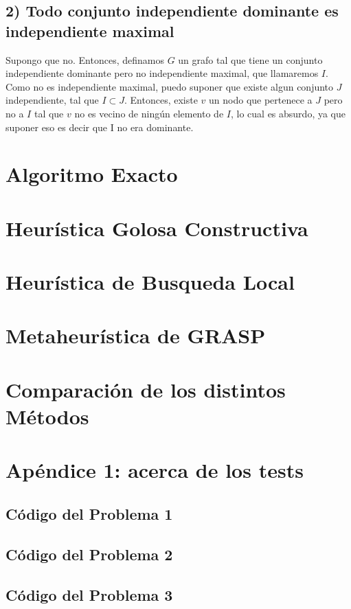 \documentclass[a4paper]{article}
\begin{document}
\subsection{2) Todo conjunto independiente dominante es independiente maximal}

Supongo que no. Entonces, definamos $G$ un grafo tal que tiene un conjunto independiente dominante pero no independiente maximal, que llamaremos $I$. Como no es independiente maximal, puedo suponer que existe algun conjunto $J$ independiente, tal que $I \subset J$. Entonces, existe $v$ un nodo que pertenece a $J$ pero no a $I$ tal que $v$ no es vecino de ningún elemento de $I$, lo cual es absurdo, ya que suponer eso es decir que I no era dominante. 

\section{Algoritmo Exacto}


\newpage
\section{Heurística Golosa Constructiva}


\newpage
\section{Heurística de Busqueda Local}


\newpage
\section{Metaheurística de GRASP}


\newpage
\section{Comparación de los distintos Métodos}


\newpage
\section{Apéndice 1: acerca de los tests}


\subsection{Código del Problema 1}

\subsection{Código del Problema 2}



\subsection{Código del Problema 3}
\end{document}
